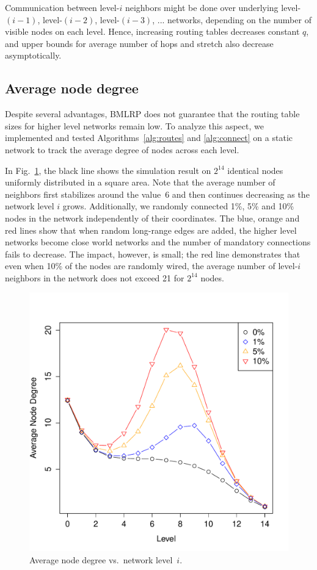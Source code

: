 \documentclass[conference]{IEEEtran}
\theoremstyle{definition}
\begin{document}
Communication between level-$i$ neighbors might be done over underlying level-$(i-1)$, level-$(i-2)$, level-$(i-3)$, ... networks, depending on the number of visible nodes on each level. Hence, increasing routing tables decreases constant $q$, and upper bounds for average number of hops and stretch also decrease asymptotically.


\subsection{Average node degree}
\label{sec:analysis:nodedegree}

Despite several advantages, BMLRP does not guarantee that the routing table sizes for higher level networks remain low. To analyze this aspect, we implemented and tested Algorithms~\ref{alg:routes} and \ref{alg:connect} on a static network to track the average degree of nodes across each level.

In Fig.~\ref{fig:degrees}, the black line shows the simulation result on $2^{14}$ identical nodes uniformly distributed in a square area. Note that the average number of neighbors first stabilizes around the value~6 and then continues decreasing as the network level $i$ grows. Additionally, we randomly connected 1\%, 5\% and 10\% nodes in the network independently of their coordinates. The blue, orange and red lines show that when random long-range edges are added, the higher level networks become close world networks and the number of mandatory connections fails to decrease. The impact, however, is small; the red line demonstrates that even when 10\% of the nodes are randomly wired, the average number of level-$i$ neighbors in the network does not exceed 21 for $2^{14}$ nodes.

\begin{figure}[H]
   \includegraphics[width=0.95\linewidth]{degrees}

   \caption{Average node degree vs.\ network level~$i$.}
    \label{fig:degrees}
\end{figure}
\end{document}
